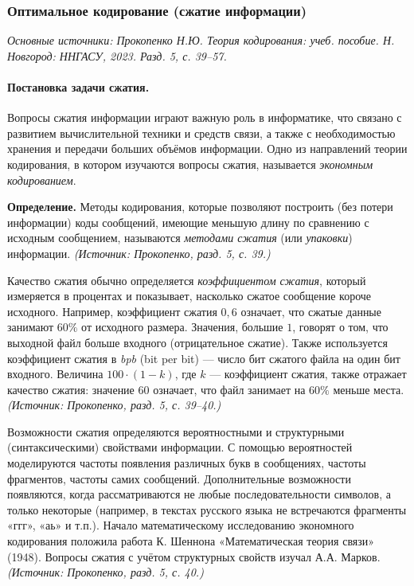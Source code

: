 \documentclass[a4paper,12pt]{article}
\begin{document}
\subsubsection{Оптимальное кодирование (сжатие информации)}

\noindent\textit{Основные источники: Прокопенко Н.Ю. Теория кодирования: учеб. пособие. Н. Новгород: ННГАСУ, 2023. Разд. 5, с. 39--57.}

\paragraph{Постановка задачи сжатия.}
Вопросы сжатия информации играют важную роль в информатике, что связано с развитием вычислительной техники и средств связи, а также с необходимостью хранения и передачи больших объёмов информации. Одно из направлений теории кодирования, в котором изучаются вопросы сжатия, называется \emph{экономным кодированием}.

\textbf{Определение.} Методы кодирования, которые позволяют построить (без потери информации) коды сообщений, имеющие меньшую длину по сравнению с исходным сообщением, называются \emph{методами сжатия} (или \emph{упаковки}) информации.
\textit{(Источник: Прокопенко, разд. 5, с. 39.)}

Качество сжатия обычно определяется \emph{коэффициентом сжатия}, который измеряется в процентах и показывает, насколько сжатое сообщение короче исходного. Например, коэффициент сжатия \(0{,}6\) означает, что сжатые данные занимают \(60\%\) от исходного размера. Значения, большие \(1\), говорят о том, что выходной файл больше входного (отрицательное сжатие). Также используется коэффициент сжатия в \emph{bpb} (bit per bit) — число бит сжатого файла на один бит входного. Величина \(100\cdot(1-k)\), где \(k\) — коэффициент сжатия, также отражает качество сжатия: значение \(60\) означает, что файл занимает на \(60\%\) меньше места.
\textit{(Источник: Прокопенко, разд. 5, с. 39--40.)}

Возможности сжатия определяются вероятностными и структурными (синтаксическими) свойствами информации. С помощью вероятностей моделируются частоты появления различных букв в сообщениях, частоты фрагментов, частоты самих сообщений. Дополнительные возможности появляются, когда рассматриваются не любые последовательности символов, а только некоторые (например, в текстах русского языка не встречаются фрагменты «ггг», «аь» и т.п.). Начало математическому исследованию экономного кодирования положила работа К. Шеннона «Математическая теория связи» (1948). Вопросы сжатия с учётом структурных свойств изучал А.А. Марков.
\textit{(Источник: Прокопенко, разд. 5, с. 40.)}
\end{document}
